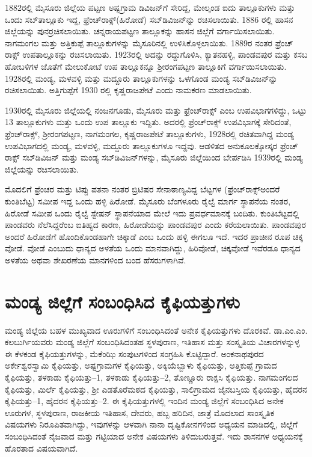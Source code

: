 1882ರಲ್ಲಿ ಮೈಸೂರು ಜಿಲ್ಲೆಯ ಪಟ್ಟಣ ಅಷ್ಟಗ್ರಾಮ ಡಿವಿಜನ್​ಗೆ ಸೇರಿದ್ದ, ಮೇಲ್ಕಂಡ ಐದು ತಾಲ್ಲೂಕುಗಳು ಮತ್ತು ಒಂದು ಸಬ್​ತಾಲ್ಲೂಕು ಇದ್ದ, ಫ್ರೆಂಚ್​ರಾಕ್ಸ್​(ಹಿರೋಡೆ) ಸಬ್​ಡಿವಿಜನ್​ನ್ನು ರಚಿಸಲಾಯಿತು. 1886 ರಲ್ಲಿ ಹಾಸನ ಜಿಲ್ಲೆಯನ್ನು ಪುನರ್ರಚಿಸಲಾಯಿತು. ಚನ್ನರಾಯಪಟ್ಟಣ ತಾಲ್ಲೂಕನ್ನು ಹಾಸನ ಜಿಲ್ಲೆಗೆ ವರ್ಗಾಯಿಸಲಾಯಿತು. ನಾಗಮಂಗಲ ಮತ್ತು ಅತ್ತಿಕುಪ್ಪೆ ತಾಲ್ಲೂಕುಗಳನ್ನು ಮೈಸೂರಿನಲ್ಲಿ ಉಳಿಸಿಕೊಳ್ಳಲಾಯಿತು. 1889ರ ನಂತರ ಫ್ರೆಂಚ್​ರಾಕ್ಸ್​ ಉಪತಾಲ್ಲೂಕನ್ನು ರಚಿಸಲಾಯಿತು. 1923ರಲ್ಲಿ ಅದನ್ನು ರದ್ದುಗೊಳಿಸಿ, ಕ್ಯಾತನಹಳ್ಳಿ, ಪಾಂಡವಪುರ ಮತ್ತು ಕಸಬ ಹೋಬಳಿಗಳ ಜೊತೆಗೆ ಮೇಲುಕೋಟೆ ಉಪ ತಾಲ್ಲೂಕನ್ನೂ ಶ‍್ರೀರಂಗಪಟ್ಟಣ ತಾಲ್ಲೂಕಿಗೆ ವರ್ಗಾಯಿಸಲಾಯಿತು. 1928ರಲ್ಲಿ ಮಂಡ್ಯ, ಮಳವಳ್ಳಿ ಮತ್ತು ಮದ್ದೂರು ತಾಲ್ಲೂಕುಗಳನ್ನು ಒಳಗೊಂಡ ಮಂಡ್ಯ ಸಬ್​ಡಿವಿಜನ್​ನ್ನು ರಚಿಸಲಾಯಿತು. ಅತ್ತಿಗುಪ್ಪೆಗೆ 1930 ರಲ್ಲಿ ಕೃಷ್ಣರಾಜಪೇಟೆ ಎಂದು ನಾಮಕರಣ ಮಾಡಲಾಯಿತು.

1930ರಲ್ಲಿ ಮೈಸೂರು ಜಿಲ್ಲೆಯಲ್ಲಿ ನಂಜನಗೂಡು, ಮೈಸೂರು ಮತ್ತು ಫ್ರೆಂಚ್​ರಾಕ್ಸ್​ ಎಂಬ ಉಪವಿಭಾಗಗಳಿದ್ದು, ಒಟ್ಟು 13 ತಾಲ್ಲೂಕುಗಳು ಮತ್ತು ಒಂದು ಉಪ ತಾಲ್ಲೂಕು ಇದ್ದಿತು. ಅದರಲ್ಲಿ ಫ್ರೆಂಚ್​ರಾಕ್ಸ್​ ಉಪವಿಭಾಗಕ್ಕೆ ಸೇರಿದಂತೆ, ಫ್ರೆಂಚ್​ರಾಕ್ಸ್​, ಶ‍್ರೀರಂಗಪಟ್ಟಣ, ನಾಗಮಂಗಲ, ಕೃಷ್ಣರಾಜಪೇಟೆ ತಾಲ್ಲೂಕುಗಳು, 1928ರಲ್ಲಿ ರಚಿತವಾಗಿದ್ದ ಮಂಡ್ಯ ಉಪವಿಭಾಗದಲ್ಲಿ ಮಂಡ್ಯ, ಮಳವಳ್ಳಿ, ಮದ್ದೂರು ತಾಲ್ಲೂಕುಗಳೂ ಇದ್ದವು. ಆಡಳಿತದ ಅನುಕೂಲಕ್ಕೋಸ್ಕರ ಫ್ರೆಂಚ್​ರಾಕ್ಸ್​ ಸಬ್​ಡಿವಿಜನ್​ ಮತ್ತು ಮಂಡ್ಯ ಸಬ್​ಡಿವಿಜನ್​ಗಳನ್ನು, ಮೈಸೂರು ಜಿಲ್ಲೆಯಿಂದ ಬೇರ್ಪಡಿಸಿ 1939ರಲ್ಲಿ ಮಂಡ್ಯ ಜಿಲ್ಲೆಯನ್ನು ರಚಿಸಲಾಯಿತು.

ಮೊದಲಿಗೆ ಫ್ರೆಂಚರ ಮತ್ತು ಟಿಪ್ಪು ಪತನಾ ನಂತರ ಬ್ರಿಟಿಷರ ಸೇನಾಠಾಣ್ಯವಿದ್ದ ಬೆಟ್ಟಗಳ (ಫ್ರೆಂಚ್​ರಾಕ್ಸ್​ ಅಂದರೆ ಕುಂತಿಬೆಟ್ಟ) ಸಮೀಪ ಇದ್ದ ಒಂದು ಹಳ್ಳಿ ಹಿರೋಡೆ. ಮೈಸೂರು ಬೆಂಗಳೂರು ರೈಲ್ವೆ ಮಾರ್ಗ ಸ್ಥಾಪನೆಯ ನಂತರ, ಹಿರೋಡೆ ಸಮೀಪ ಒಂದು ರೈಲ್ವೆ ಸ್ಟೇಷನ್​ ಸ್ಥಾಪನೆಯಾದ ಮೇಲೆ ಇದು ಪ್ರವರ್ಧಮಾನಕ್ಕೆ ಬಂದಿತು. ಕುಂತಿಬೆಟ್ಟದಲ್ಲಿ ಪಾಂಡವರು ನೆಲೆಸಿದ್ದರೆಂಬ ಐತಿಹ್ಯದ ಕಾರಣ, ಹಿರೋಡೆಯನ್ನು ಪಾಂಡವಪುರ ಎಂದು ಕರೆಯಲಾಯಿತು. ಪಾಂಡವಪುರ ಅಂದರೆ ಹಿರೋಡೆಗೆ ಹೊಂದಿಕೊಂಡಹಾಗೇ ಚಿಕ್ಕಾಡೆ ಎಂಬ ಒಂದು ಹಳ್ಳಿ ಈಗಲೂ ಇದೆ. ಇದರ ಪ್ರಾಚೀನ ರೂಪ ಚಿಕ್ಕ ವೋಡೆ. ವೋಡೆ ಎಂಬುದು ಧಾನ್ಯದ ಅಳತೆಯ ಒಂದು ಮಾನವಾಗಿದ್ದು, ಹಿರಿವೋಡೆ, ಚಿಕ್ಕವೋಡೆ ಇವೆರಡೂ ಧಾನ್ಯದ ಅಳತೆಯ ಅಥವಾ ಶೇಖರಣೆಯ ಮಾನಗಳಿಂದ ಬಂದ ಹೆಸರುಗಳಾಗಿವೆ.


\section{ಮಂಡ್ಯ ಜಿಲ್ಲೆಗೆ ಸಂಬಂಧಿಸಿದ ಕೈಫಿಯತ್ತುಗಳು}

ಮಂಡ್ಯ ಜಿಲ್ಲೆಯ ಬಹಳ ಮುಖ್ಯವಾದ ಊರುಗಳಿಗೆ ಸಂಬಂಧಿಸಿದಂತೆ ಅನೇಕ ಕೈಫಿಯತ್ತುಗಳು ದೊರಕಿವೆ. ಡಾ.ಎಂ.ಎಂ. ಕಲಬುರ್ಗಿಯವರು ಮಂಡ್ಯ ಜಿಲ್ಲೆಗೆ ಸಂಬಂಧಿಸಿದಂತಹ ಸ್ಥಳಪುರಾಣ, ಇತಿಹಾಸ ಮತ್ತು ಸಂಸ್ಕೃತಿಯ ವಿಚಾರಗಳನ್ನುಳ್ಳ ಈ ಕೆಳಕಂಡ ಕೈಫಿಯತ್ತುಗಳನ್ನು, ಮೆಕೆಂಝಿ ಸಂಪುಟಗಳಿಂದ ಸಂಗ್ರಹಿಸಿ ಕೊಟ್ಟಿದ್ದಾರೆ. ಅಂಕನಾಥಪುರದ ಅರ್ಕೇಶ್ವರಸ್ವಾಮಿ ಕೈಫಿಯತ್ತು, ಅಷ್ಟಗ್ರಾಮಗಳ ಕೈಫಿಯತ್ತು, ಅಕ್ಕಿಯೆಬ್ಬಾಳು ಕೈಫಿಯತ್ತು, ಅತ್ತಿಕುಪ್ಪೆ ಗ್ರಾಮದ ಕೈಫಿಯತ್ತು, ತಳಕಾಡು ಕೈಫಿಯತ್ತು–1, ತಳಕಾಡು ಕೈಫಿಯತ್ತು–2, ತೊಣ್ಣೂರು ರಾಕ್ಷಸಿ ಕೈಫಿಯತ್ತು. ನಾಗಮಂಗಲದ ಕೈಫಿಯತ್ತು, ಮಿರ್ಲೆ ಕೈಫಿಯತ್ತು, ಶ‍್ರೀ ಎಡತೊರೆಮಠದ ಕೈಫಿಯತ್ತು, ಸಾಲಿಗ್ರಾಮದ ಜೈನಬಸ್ತಿಯ ಕೈಫಿಯತ್ತು, ಹೈದರನ ಕೈಫಿಯತ್ತು–1, ಹೈದರನ ಕೈಫಿಯತ್ತು–2. ಈ ಕೈಫಿಯತ್ತುಗಳಲ್ಲಿ ಇಂದಿನ ಮಂಡ್ಯ ಜಿಲ್ಲೆಗೆ ಸಂಬಂಧಿಸಿದ ಅನೇಕ ಊರುಗಳ, ಸ್ಥಳಪುರಾಣ, ರಾಜಕೀಯ ಇತಿಹಾಸ, ದೇವರು, ಹಬ್ಬ ಹರಿದಿನ, ಜಾತ್ರೆ ಮೊದಲಾದ ಸಾಂಸ್ಕೃತಿಕ ವಿಷಯಗಳು ನಿರೂಪಿತವಾಗಿದ್ದು, ಇವುಗಳನ್ನು ಆಳವಾಗಿ ನಾನಾ ದೃಷ್ಟಿಕೋನಗಳಿಂದ ಅಧ್ಯಯನ ಮಾಡಿದಲ್ಲಿ, ಜಿಲ್ಲೆಗೆ ಸಂಬಂಧಿಸಿದಂತೆ ನೈಜವಾದ ಮತ್ತು ಗಟ್ಟಿಯಾದ ಅನೇಕ ವಿಷಯಗಳು ತಿಳಿದುಬರುತ್ತವೆ. ಇದು ಶಾಸನಗಳ ಅಧ್ಯಯನಕ್ಕೆ ಹೊರತಾದ ವಿಷಯವಾಗಿದೆ.


